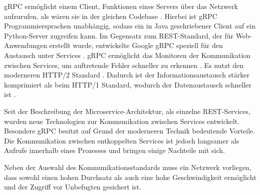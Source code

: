 gRPC ermöglicht einem Client, Funktionen eines Servers über das Netzwerk aufzurufen, als wären sie in der gleichen Codebase \parencite[vgl.][]{grpc_docs}. Hierbei ist gRPC Programmiersprachen unabhängig, sodass ein in Java geschriebener Client auf ein Python-Server zugreifen kann. Im Gegensatz zum REST-Standard, der für Web-Anwendungen erstellt wurde, entwickelte Google gRPC speziell für den Austausch unter Services \parencite[vgl.][]{grpc_docs}. gRPC ermöglicht das Monitoren der Kommunikation zwischen Services, um auftretende Fehler schneller zu erkennen \parencite[vgl.][]{grpc_docs}. Es nutzt den moderneren HTTP/2 Standard \parencite[vgl.][]{grpc_wiki_2020}. Dadurch ist der Informationsaustausch stärker komprimiert als beim HTTP/1 Standard, wodurch der Datenaustausch schneller ist \parencite[vgl.][]{hypertext_wiki_2020}.

Seit der Beschreibung der Microservice-Architektur, als einzelne REST-Services\footnotemark, wurden neue Technologien zur Kommunikation zwischen Services entwickelt. Besondere gRPC besitzt auf Grund der moderneren Technik bedeutende Vorteile. Die Kommunikation zwischen entkoppelten Services ist jedoch langsamer als Aufrufe innerhalb eines Prozesses und bringen einige Nachteile mit sich.

Neben der Auswahl des Kommunikationsstandards muss ein Netzwerk vorliegen, dass sowohl einen hohen Durchsatz als auch eine hohe Geschwindigkeit ermöglicht und der Zugriff vor Unbefugten gesichert ist.
